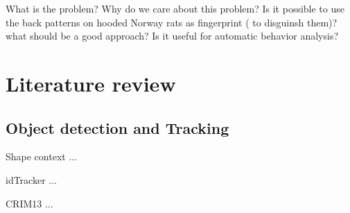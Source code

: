 \documentclass[conference]{IEEEtran}
\begin{document}





What is the problem?
Why do we care about this problem?
Is it possible to use the back patterns on hooded Norway rats as fingerprint ( to disguinsh them)?
what should be a good approach?
Is it useful for automatic behavior analysis?



\section{Literature review}
\subsection{Object detection and Tracking}
Shape context \cite{belongie2002shape} ...

idTracker \cite{perez2014idtracker}...

CRIM13 \cite{CRIM13}...


  

\end{document}

